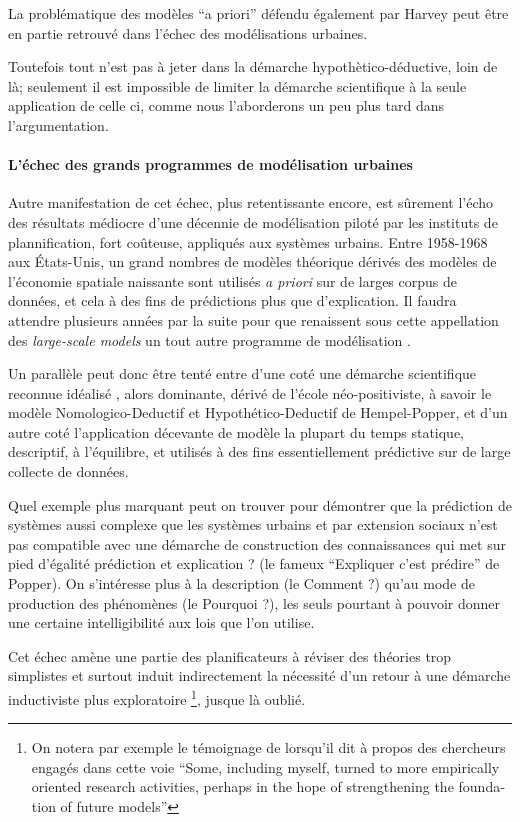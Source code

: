 La problématique des modèles \enquote{a priori} défendu également par Harvey peut être en partie retrouvé dans l'échec des modélisations urbaines. 

Toutefois tout n'est pas à jeter dans la démarche hypothètico-déductive, loin de là; seulement il est impossible de limiter la démarche scientifique à la seule application de celle ci, comme nous l'aborderons un peu plus tard dans l'argumentation.

\paragraph{L'échec des grands programmes de modélisation urbaines}

Autre manifestation de cet échec, plus retentissante encore, est sûrement l'écho \autocite{Lee1973} des résultats médiocre d'une décennie de modélisation piloté par les instituts de plannification, fort coûteuse, appliqués aux systèmes urbains. Entre 1958-1968 aux États-Unis, un grand nombres de modèles théorique \autocite[7-9]{Batty1979} dérivés des modèles de l'économie spatiale naissante sont utilisés \textit{a priori} sur de larges corpus de données, et cela à des fins de prédictions plus que d'explication. Il faudra attendre plusieurs années par la suite pour que renaissent sous cette appellation des \textit{large-scale models} un tout autre programme de modélisation \autocite{Boyce1988}. 

Un parallèle peut donc être tenté entre d'une coté une démarche scientifique reconnue idéalisé \autocite{Besse2000}, alors dominante, dérivé de l'école néo-positiviste, à savoir le modèle Nomologico-Deductif et Hypothético-Deductif de Hempel-Popper, et d'un autre coté l'application décevante de modèle la plupart du temps statique, descriptif, à l'équilibre, et utilisés à des fins essentiellement prédictive sur de large collecte de données. 

Quel exemple plus marquant peut on trouver pour démontrer que la prédiction de systèmes aussi complexe que les systèmes urbains et par extension sociaux n'est pas compatible avec une démarche de construction des connaissances qui met sur pied d'égalité prédiction et explication ? (le fameux \enquote{Expliquer c'est prédire} de Popper). On s’intéresse plus à la description (le Comment ?) qu'au mode de production des phénomènes (le Pourquoi ?), les seuls pourtant à pouvoir donner une certaine intelligibilité aux lois que l'on utilise. \autocite[14-15]{Besse2000} 

Cet échec amène une partie des planificateurs à réviser des théories trop simplistes et surtout induit indirectement la nécessité d'un retour à une démarche inductiviste plus exploratoire \footnote{On notera par exemple le témoignage de \autocite{Boyce1988} lorsqu'il dit à propos des chercheurs engagés dans cette voie \foreignquote{english}{Some, including myself, turned to more empirically oriented research activities, perhaps in the hope of strengthening the foundation of future models}}, jusque là oublié.

